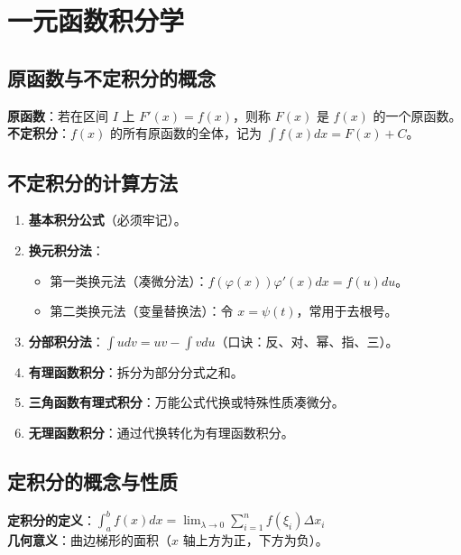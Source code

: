 \documentclass[a4paper,12pt]{ctexart}
\newenvironment{purplebox}
  {\begin{tcolorbox}[colback=white, colframe=boxpurple, boxrule=1pt, sharp corners, title=\textbf{定义/定理/核心公式}]}
  {\end{tcolorbox}}
\begin{document}
\section{一元函数积分学}

\subsection{原函数与不定积分的概念}
\begin{purplebox}
    \textbf{原函数}：若在区间 $I$ 上 $F'(x) = f(x)$，则称 $F(x)$ 是 $f(x)$ 的一个原函数。 \\
    \textbf{不定积分}：$f(x)$ 的所有原函数的全体，记为 $\int f(x) dx = F(x) + C$。
\end{purplebox}

\subsection{不定积分的计算方法}
\begin{enumerate}
    \item \textbf{基本积分公式}（必须牢记）。
    \item \textbf{换元积分法}：
    \begin{itemize}
        \item 第一类换元法（凑微分法）：$f(\varphi(x))\varphi'(x)dx = f(u)du$。
        \item 第二类换元法（变量替换法）：令 $x = \psi(t)$，常用于去根号。
    \end{itemize}
    \item \textbf{分部积分法}：$\int u dv = uv - \int v du$（口诀：反、对、幂、指、三）。
    \item \textbf{有理函数积分}：拆分为部分分式之和。
    \item \textbf{三角函数有理式积分}：万能公式代换或特殊性质凑微分。
    \item \textbf{无理函数积分}：通过代换转化为有理函数积分。
\end{enumerate}

\subsection{定积分的概念与性质}
\begin{purplebox}
    \textbf{定积分的定义}：$\int_a^b f(x) dx = \lim_{\lambda \to 0} \sum_{i=1}^n f(\xi_i) \Delta x_i$ \\
    \textbf{几何意义}：曲边梯形的面积（$x$ 轴上方为正，下方为负）。
\end{purplebox}
\end{document}
